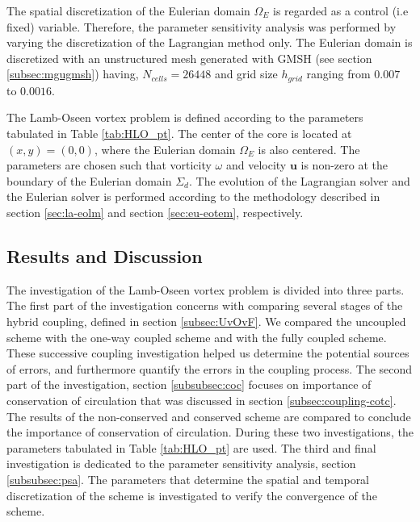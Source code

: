 The spatial discretization of the Eulerian domain $\Omega_E$ is regarded as a control (i.e fixed) variable. Therefore, the parameter sensitivity analysis was performed by varying the discretization of the Lagrangian method only. The Eulerian domain is discretized with an unstructured mesh generated with GMSH (see section \ref{subsec:mgugmsh}) having, $N_{cells} = 26448$  and grid size $h_{grid}$ ranging from $0.007$ to $0.0016$. 

The Lamb-Oseen vortex problem is defined according to the parameters tabulated in Table \ref{tab:HLO_pt}. The center of the core is located at $(x,y)=(0,0)$, where the Eulerian domain $\Omega_E$ is also centered. The parameters are chosen such that vorticity $\omega$ and velocity $\mathbf{u}$ is non-zero at the boundary of the Eulerian domain $\Sigma_d$. The evolution of the Lagrangian solver and the Eulerian solver is performed according to the methodology described in section \ref{sec:la-eolm} and section \ref{sec:eu-eotem}, respectively.


\subsection{Results and Discussion}

The investigation of the Lamb-Oseen vortex problem is divided into three parts. The first part of the investigation concerns with comparing several stages of the hybrid coupling, defined in section \ref{subsec:UvOvF}. We compared the uncoupled scheme with the one-way coupled scheme and with the fully coupled scheme. These successive coupling investigation helped us determine the potential sources of errors, and furthermore quantify the errors in the coupling process. The second part of the investigation, section \ref{subsubsec:coc} focuses on importance of conservation of circulation that was discussed in section \ref{subsec:coupling-cotc}. The results of the non-conserved and conserved scheme are compared to conclude the importance of conservation of circulation. During these two investigations, the parameters tabulated in Table \ref{tab:HLO_pt} are used. The third and final investigation is dedicated to the parameter sensitivity analysis, section \ref{subsubsec:psa}. The parameters that determine the spatial and temporal discretization of the scheme is investigated to verify the convergence of the scheme.

